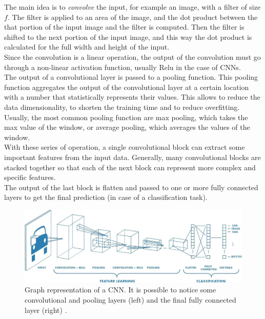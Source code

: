 
The main idea is to \emph{convolve} the input, for example an image, with a filter of size $f$. The filter is applied to an area of the image, and the dot product between the that portion of the input image and the filter is computed. Then the filter is shifted to the next portion of the input image, and this way the dot product is calculated for the full width and height of the input.\\
Since the convolution is a linear operation, the output of the convolution must go through a non-linear activation function, usually \gls{Relu} in the case of \glspl{CNN}. \\

The output of a convolutional layer is passed to a pooling function. This pooling function aggregates the output of the convolutional layer at a certain location with a number that statistically represents their values. This allows to reduce the data dimensionality, to shorten the training time and to reduce overfitting.\\
Usually, the most common pooling function are max pooling, which takes the max value of the window, or average pooling, which averages the values of the window. \\

With these series of operation, a single convolutional block can extract some important features from the input data. Generally, many convolutional blocks are stacked together so that each of the next block can represent more complex and specific features. \\
The output of the last block is flatten and passed to one or more fully connected layers to get the final prediction (in case of a classification task). \\

\begin{figure}[H]
\centering
    \includegraphics[width=.75\linewidth]{images/Background/ML/ConvNNjpeg.jpeg}
\caption[Graph representation of a convolution neural network]{Graph representation of a \gls{CNN}. It is possible to notice some convolutional and pooling layers (left) and the final fully connected layer (right) \cite{cnn}.}
\end{figure}

